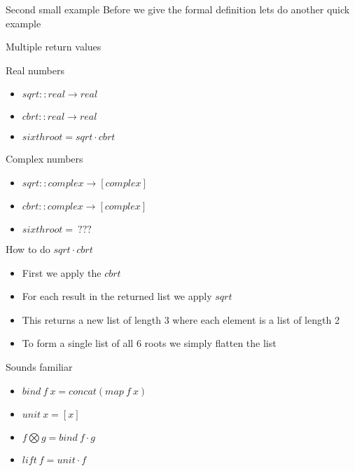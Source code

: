 \begin{frame}[fragile]{}
    \begin{block}{Second small example}
        Before we give the formal definition lets do another quick example
    \end{block}
\end{frame}

\begin{frame}[fragile]{Multiple return values}
    \begin{block}{Real numbers}
        \begin{itemize}
            \item $sqrt :: real \rightarrow real$
            \item $cbrt :: real \rightarrow real$
            \item $sixthroot = sqrt \cdot cbrt$
        \end{itemize}
    \end{block}
    \begin{block}{Complex numbers}
        \begin{itemize}
            \item $sqrt :: complex \rightarrow [complex]$
            \item $cbrt :: complex \rightarrow [complex]$
            \item $sixthroot = \: ???$
        \end{itemize}
    \end{block}
\end{frame}

\begin{frame}[fragile]{}
    \begin{block}{How to do $sqrt \cdot cbrt$}
        \begin{itemize}
            \item First we apply the $cbrt$
            \item For each result in the returned list we apply $sqrt$
            \item This returns a new list of length 3 where each element is a list of length 2
            \item To form a single list of all 6 roots we simply flatten the list
        \end{itemize}
    \end{block}
\end{frame}

\begin{frame}[fragile]{}
    \begin{block}{Sounds familiar}
        \begin{itemize}
            \item $bind \: f \: x = concat ( map \: f \: x)$
            \item $unit \: x = [x]$
            \item $f \bigotimes g = bind \: f \cdot g$
            \item $lift \: f = unit \cdot f$
        \end{itemize}
    \end{block}
\end{frame}
